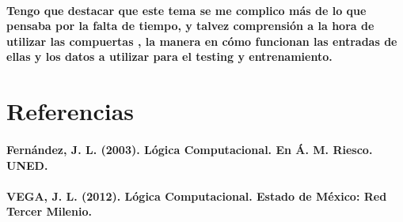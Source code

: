 \documentclass[10pt,a4paper]{article}
\begin{document}
\paragraph{Tengo que destacar que este tema se me complico m\'as de lo que pensaba por la falta de tiempo, y talvez comprensi\'on a la hora de utilizar las compuertas , la manera en c\'omo funcionan las entradas de ellas y los datos a utilizar para el testing y entrenamiento.}

\section{Referencias}
\paragraph{Fern\'andez, J. L. (2003). L\'ogica Computacional. En \'A. M. Riesco. UNED.}
\paragraph{VEGA, J. L. (2012). L\'ogica Computacional. Estado de M\'exico: Red Tercer Milenio.}
\end{document}
